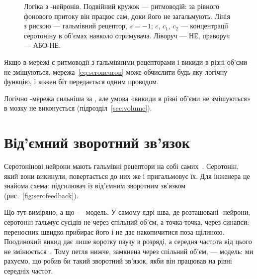 \begin{figure}[t]
\centering
{}
\caption{Логіка з -нейронів. Подвійний кружок --- ритмоводій: за рівного фонового притоку він працює сам, доки його не загальмують. Лінія з рискою --- гальмівний рецептор, $s=-1$; $c$, $c_1$, $c_2$ --- концентрації серотоніну в об'ємах навколо отримувача. Ліворуч --- НЕ, праворуч --- АБО-НЕ.}
\label{fig:serogates}
\end{figure}

\begin{keyblock}
\begin{proposition}
\label{prop:serocomplete}
Якщо в мережі є ритмоводії з гальмівними рецепторами і викиди в різні об'єми не змішуються, мережа~\eqref{eq:seroneuron} може обчислити будь-яку логічну функцію, і кожен біт передається одним проводом.
\end{proposition}
\end{keyblock}

Логічно -мережа сильніша за , але умова «викиди в різні об'єми не змішуються» в мозку не виконується (підрозділ~\ref{sec:volume}).

\section{Від'ємний зворотний зв'язок}

Серотонінові нейрони мають гальмівні рецептори на собі самих~\cite{Sprouse1987}. Серотонін, який вони викинули, повертається до них же і пригальмовує їх. Для інженера це знайома схема: підсилювач із від'ємним зворотним зв'язком (рис.~\ref{fig:serofeedback}).

Що тут виміряно, а що --- модель. У самому ядрі шва, де розташовані -нейрони, серотонін гальмує сусідів не через спільний об'єм, а точка-точка, через синапси: переносник швидко прибирає його і не дає накопичитися поза щілиною. Поодинокий викид дає лише коротку паузу в розряді, а середня частота від цього не змінюється~\cite{CourtneyFord2016}. Тому петля нижче, замкнена через спільний об'єм, --- модель: ми рахуємо, що робив би такий зворотний зв'язок, якби він працював на рівні середніх частот.

